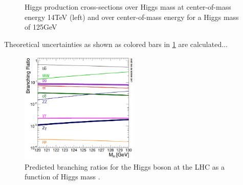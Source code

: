 \begin{figure}[H]
    \centering
    \qquad
    \caption{Higgs production cross-sections over Higgs mass at center-of-mass energy 14TeV (left) and over center-of-mass energy for a Higgs mass of 125GeV \cite{LHCCrossSectionWG}}%
    \label{fig:HiggsCrosssection}%
\end{figure}

Theoretical uncertainties as shown as colored bars in \ref{fig:HiggsCrosssection} are calculated...

\begin{figure}[H]
        \centering
    \includegraphics[width=0.5\textwidth] {Pictures/HiggsBranching.png}\hspace{1cm}
    \caption{Predicted branching ratios for the Higgs boson at the LHC as a function of Higgs mass \cite{LHCCrossSectionWG}.}
    \label{fig:FeynmannHiggs}
\end{figure}


